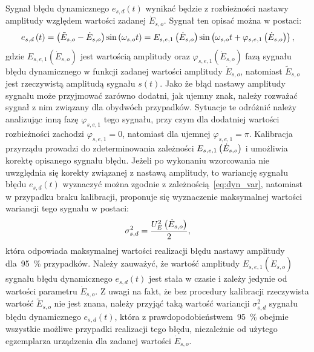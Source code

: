Sygnał błędu dynamicznego $e_{s,d}(t)$ wynikać będzie z rozbieżności nastawy amplitudy względem wartości zadanej $\dot{E}_{s,o}$. Sygnał ten opisać można w postaci:
\begin{equation}
e_{s,d} \left(t\right) = \left(\tilde{E}_{s,o} - \dot{E}_{s,o}\right) \sin \left(\omega_{s,o} t\right) = E_{s,e,1} \left(\dot{E}_{s,o}\right) \sin \left(\omega_{s,o} t + \varphi_{s,e,1} \left(\dot{E}_{s,o}\right)\right) \label{eq:pom_gen_err_dyn_mono},
\end{equation}
gdzie $E_{s,e,1}(\dot{E}_{s,o})$ jest wartością amplitudy oraz $\varphi_{s,e,1}(\dot{E}_{s,o})$ fazą sygnału błędu dynamicznego w funkcji zadanej wartości amplitudy $\dot{E}_{s,o}$, natomiast $\tilde{E}_{s,o}$ jest rzeczywistą amplitudą sygnału $s(t)$. Jako że błąd nastawy amplitudy sygnału może przyjmować zarówno dodatni, jak ujemny znak, należy rozważać sygnał z nim związany dla obydwóch przypadków. Sytuacje te odróżnić należy analizując inną fazę $\varphi_{s,e,1}$ tego sygnału, przy czym dla dodatniej wartości rozbieżności zachodzi $\varphi_{s,e,1} = 0$, natomiast dla ujemnej $\varphi_{s,e,1} = \pi$. Kalibracja przyrządu prowadzi do zdeterminowania zależności $E_{s,e,1} \left(\dot{E}_{s,o}\right)$ i umożliwia korektę opisanego sygnału błędu. Jeżeli po wykonaniu wzorcowania nie uwzględnia się korekty związanej z nastawą amplitudy, to wariancję sygnału błędu $e_{s,d}(t)$ wyznaczyć można zgodnie z zależnością~\eqref{eq:dyn_var}, natomiast w przypadku braku kalibracji, proponuje się wyznaczenie maksymalnej wartości wariancji tego sygnału w postaci:
\begin{equation}
\sigma_{s,d}^{2} = \frac{U_{E}^{2} \left(\dot{E}_{s,o}\right)}{2} \label{eq:pom_gen_var_dyn},
\end{equation}
która odpowiada maksymalnej wartości realizacji błędu nastawy amplitudy dla~\qty{95}{\percent} przypadków. Należy zauważyć, że wartość amplitudy $E_{s,e,1}(\dot{E}_{s,o})$ sygnału błędu dynamicznego $e_{s,d}(t)$ jest stała w czasie i zależy jedynie od wartości parametru $\dot{E}_{s,o}$. Z uwagi na fakt, że bez procedury kalibracji rzeczywista wartość $\tilde{E}_{s,o}$ nie jest znana, należy przyjąć taką wartość wariancji $\sigma_{s,d}^{2}$ sygnału błędu dynamicznego $e_{s,d}(t)$, która z prawdopodobieństwem~\qty{95}{\percent} obejmie wszystkie możliwe przypadki realizacji tego błędu, niezależnie od użytego egzemplarza urządzenia dla zadanej wartości $\dot{E}_{s,o}$.

